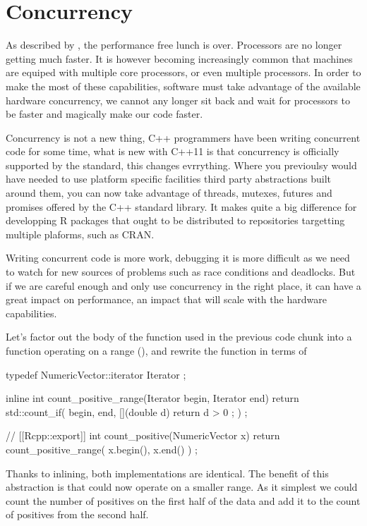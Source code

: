 \section{Concurrency}

As described by \citep{sutter2005}, the performance free lunch is over. Processors
are no longer getting much faster. It is however becoming 
increasingly common that machines are equiped with multiple core processors, or
even multiple processors. In order to make the most of these
capabilities, software must take advantage of the available hardware 
concurrency, we cannot any longer sit back and wait for processors to be faster 
and magically make our code faster. 

Concurrency is not a new thing, C++ programmers have been writing concurrent
code for some time, what is new with C++11 is that concurrency 
is officially supported by the standard, this changes evrrything. 
Where you previoulsy would have needed to use platform specific facilities 
third party abstractions built around them, you can now take advantage
of threads, mutexes, futures and promises offered by the C++ standard 
library. It makes quite a big difference for developping 
R packages that ought to be distributed to repositories targetting 
multiple plaforms, such as CRAN. 

Writing concurrent code is more work, debugging it is more difficult as we need
to watch for new sources of problems such as race conditions and deadlocks. But 
if we are careful enough and only use concurrency in the right place, it can 
have a great impact on performance, an impact that will scale with the
hardware capabilities. 

Let's factor out the body of the function used in the previous code chunk
into a function operating on a range (), 
and rewrite the  function in terms of 

\begin{example}
typedef NumericVector::iterator Iterator ;

inline int count_positive_range(Iterator begin, Iterator end){
  return std::count_if( begin, end, 
    [](double d){ return d > 0 ;}
  ) ;
}

// [[Rcpp::export]]
int count_positive(NumericVector x){
  return count_positive_range( x.begin(), x.end() ) ;
}
\end{example}

Thanks to inlining, both implementations are identical. The benefit of 
this abstraction is that  could now 
operate on a smaller range. As it simplest we could count the 
number of positives on the first half of the data and add it to 
the count of positives from the second half. 

